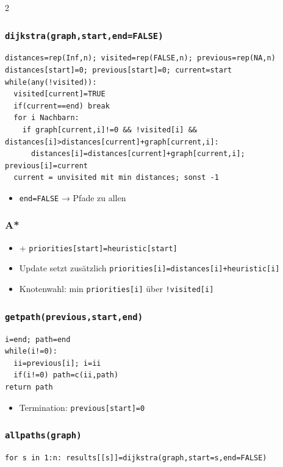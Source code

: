 \documentclass[10pt, a4paper]{article}
\begin{document}
\begin{multicols}{2}
\subsubsection{\texttt{dijkstra(graph,start,end=FALSE)}}
\begin{lstlisting}
distances=rep(Inf,n); visited=rep(FALSE,n); previous=rep(NA,n)
distances[start]=0; previous[start]=0; current=start
while(any(!visited)):
  visited[current]=TRUE
  if(current==end) break
  for i Nachbarn:
    if graph[current,i]!=0 && !visited[i] && distances[i]>distances[current]+graph[current,i]:
      distances[i]=distances[current]+graph[current,i]; previous[i]=current
  current = unvisited mit min distances; sonst -1
\end{lstlisting}

\begin{itemize}
  \item \texttt{end=FALSE} → Pfade zu allen
\end{itemize}


\subsubsection{A*}
\begin{itemize}
  \item + \texttt{priorities[start]=heuristic[start]}
  \item Update setzt zusätzlich \texttt{priorities[i]=distances[i]+heuristic[i]}
  \item Knotenwahl: min \texttt{priorities[i]} über \texttt{!visited[i]}
\end{itemize}


\subsubsection{\texttt{getpath(previous,start,end)}}
\begin{lstlisting}
i=end; path=end
while(i!=0):
  ii=previous[i]; i=ii
  if(i!=0) path=c(ii,path)
return path
\end{lstlisting}

\begin{itemize}
  \item Termination: \texttt{previous[start]=0}
\end{itemize}


\subsubsection{\texttt{allpaths(graph)}}
\begin{lstlisting}
for s in 1:n: results[[s]]=dijkstra(graph,start=s,end=FALSE)
\end{lstlisting}


\end{multicols}
\end{document}
